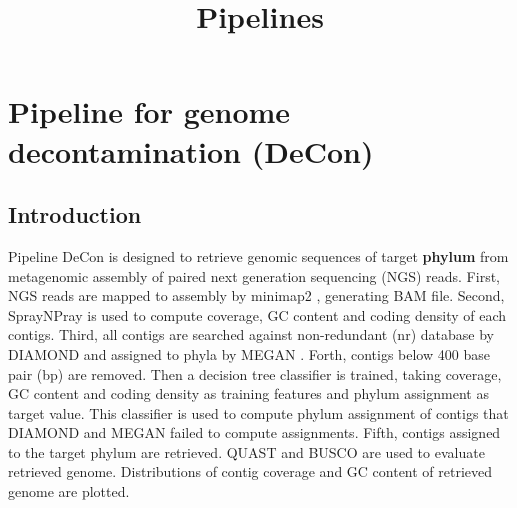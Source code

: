 \documentclass[11pt]{article}
\title{Pipelines}
\author{}
\date{}
\begin{document}
\begin{sloppypar}
  \maketitle

  \linenumbers
\section{Pipeline for genome decontamination (DeCon)}
\subsection{Introduction}
Pipeline DeCon is designed to retrieve genomic sequences of target \textbf{phylum} from metagenomic assembly of paired next generation sequencing (NGS) reads. 
First, NGS reads are mapped to assembly by minimap2 \parencite{li2018minimap2}, generating BAM file. 
Second, SprayNPray \parencite{garber2022spraynpray} is used to compute coverage, GC content and coding density of each contigs. 
Third, all contigs are searched against non-redundant (nr) database by DIAMOND \parencite{buchfink2015fast} and assigned to phyla by MEGAN \parencite{huson2007megan}. 
Forth, contigs below 400 base pair (bp) are removed. 
Then a decision tree classifier is trained, taking coverage, GC content and coding density as training features and phylum assignment as target value. 
This classifier is used to compute phylum assignment of contigs that DIAMOND and MEGAN failed to compute assignments. 
Fifth, contigs assigned to the target phylum are retrieved. 
QUAST \parencite{gurevich2013quast} and BUSCO \parencite{simao2015busco} are used to evaluate retrieved genome. 
Distributions of contig coverage and GC content of retrieved genome are plotted. 

\end{sloppypar}
\end{document}
